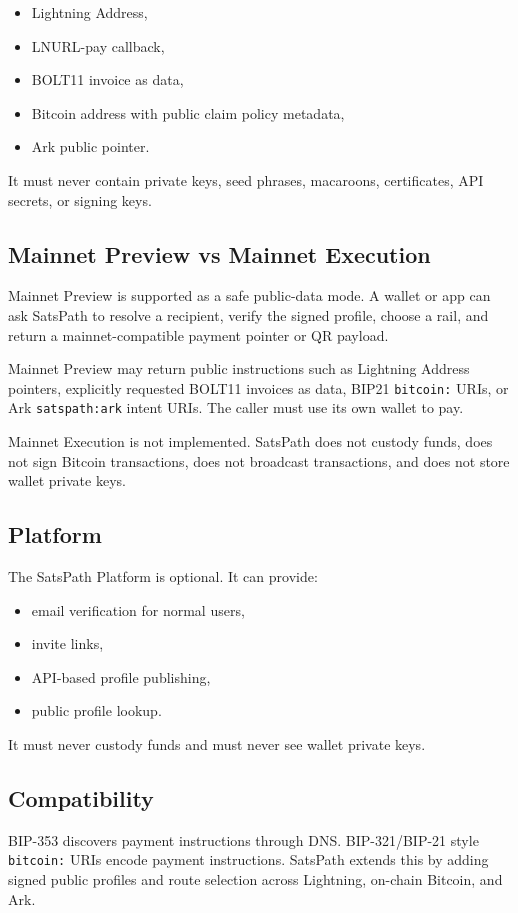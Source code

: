 \documentclass[
]{article}
\providecommand{\tightlist}{%
  \setlength{\itemsep}{0pt}\setlength{\parskip}{0pt}}
\begin{document}
\begin{itemize}
\tightlist
\item
  Lightning Address,
\item
  LNURL-pay callback,
\item
  BOLT11 invoice as data,
\item
  Bitcoin address with public claim policy metadata,
\item
  Ark public pointer.
\end{itemize}

It must never contain private keys, seed phrases, macaroons,
certificates, API secrets, or signing keys.

\hypertarget{mainnet-preview-vs-mainnet-execution}{%
\subsection{Mainnet Preview vs Mainnet
Execution}\label{mainnet-preview-vs-mainnet-execution}}

Mainnet Preview is supported as a safe public-data mode. A wallet or app
can ask SatsPath to resolve a recipient, verify the signed profile,
choose a rail, and return a mainnet-compatible payment pointer or QR
payload.

Mainnet Preview may return public instructions such as Lightning Address
pointers, explicitly requested BOLT11 invoices as data, BIP21
\texttt{bitcoin:} URIs, or Ark \texttt{satspath:ark} intent URIs. The
caller must use its own wallet to pay.

Mainnet Execution is not implemented. SatsPath does not custody funds,
does not sign Bitcoin transactions, does not broadcast transactions, and
does not store wallet private keys.

\hypertarget{platform}{%
\subsection{Platform}\label{platform}}

The SatsPath Platform is optional. It can provide:

\begin{itemize}
\tightlist
\item
  email verification for normal users,
\item
  invite links,
\item
  API-based profile publishing,
\item
  public profile lookup.
\end{itemize}

It must never custody funds and must never see wallet private keys.

\hypertarget{compatibility}{%
\subsection{Compatibility}\label{compatibility}}

BIP-353 discovers payment instructions through DNS. BIP-321/BIP-21 style
\texttt{bitcoin:} URIs encode payment instructions. SatsPath extends
this by adding signed public profiles and route selection across
Lightning, on-chain Bitcoin, and Ark.
\end{document}
